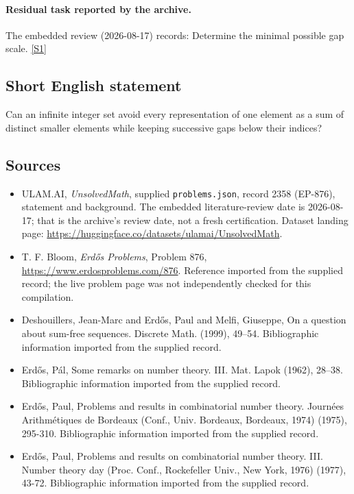\documentclass[11pt,a4paper]{article}
\newcommand{\sref}[2]{\hyperlink{source:#1:#2}{[S#2]}}
\begin{document}
\paragraph{Residual task reported by the archive.}

The embedded review (2026-08-17) records: Determine the minimal possible gap scale. \sref{2358}{1}

\subsection{Short English statement}

Can an infinite integer set avoid every representation of one element as a sum of distinct smaller elements while keeping successive gaps below their indices?

\subsection{Sources}

{\small

\begin{itemize}

\item[\hypertarget{source:2358:1}{S1}] ULAM.AI, \emph{UnsolvedMath}, supplied \texttt{problems.json}, record 2358 (EP-876), statement and background. The embedded literature-review date is 2026-08-17; that is the archive’s review date, not a fresh certification. Dataset landing page: \url{https://huggingface.co/datasets/ulamai/UnsolvedMath}.

\item[\hypertarget{source:2358:2}{S2}] T. F. Bloom, \emph{Erdős Problems}, Problem 876, \url{https://www.erdosproblems.com/876}. Reference imported from the supplied record; the live problem page was not independently checked for this compilation.

\item[\hypertarget{source:2358:3}{S3}] Deshouillers, Jean-Marc and Erd\H{o}s, Paul and Melfi, Giuseppe, On a question about sum-free sequences. Discrete Math. (1999), 49--54. Bibliographic information imported from the supplied record.

\item[\hypertarget{source:2358:4}{S4}] Erd\H{o}s, P\'{a}l, Some remarks on number theory. {III}. Mat. Lapok (1962), 28--38. Bibliographic information imported from the supplied record.

\item[\hypertarget{source:2358:5}{S5}] Erd\H{o}s, Paul, Problems and results in combinatorial number theory. Journ\'{e}es Arithm\'{e}tiques de Bordeaux (Conf., Univ. Bordeaux, Bordeaux, 1974) (1975), 295-310. Bibliographic information imported from the supplied record.

\item[\hypertarget{source:2358:6}{S6}] Erd\H{o}s, Paul, Problems and results on combinatorial number theory. III. Number theory day (Proc. Conf., Rockefeller Univ., New York, 1976) (1977), 43-72. Bibliographic information imported from the supplied record.

\end{itemize}

}

\label{end:2358}
\end{document}
